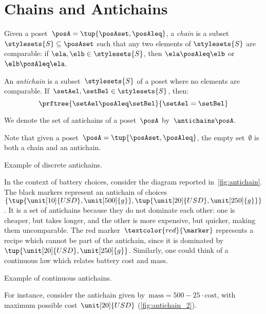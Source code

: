 

\section{Chains and Antichains}
\label{sec:chains-antichains}

\begin{definition}
    \label{def:chain}
    Given a poset~$\posA = \tup{\posAset, \posAleq}$, a \emph{chain} is a subset~$\stylesets{S} \subseteq \posAset$ such that any two elements of $\stylesets{S}$ are comparable: if $\ela, \elb \in \stylesets{S}$, then $\ela \posAleq \elb$ or $\elb \posAleq \ela$.
\end{definition}


\begin{definition}
    \label{def:antichain}
    An \emph{antichain} is a subset~$\stylesets{S}$ of a poset where no elements are comparable.
    If~$\setAel,\setBel \in \stylesets{S}$, then:
    \begin{equation}
        \prftree{\setAel \posAleq \setBel}{\setAel=\setBel}
    \end{equation}
\end{definition}

We denote the set of antichains of a poset~$\posA$ by~$\antichains\posA$.

\begin{remark}
    Note that given a poset~$\posA=\tup{\posAset,\posAleq}$, the empty set~$\emptyset$ is both a chain and an antichain.
\end{remark}


\begin{marginfigure}
    \centering
    \caption{Example of discrete antichains.}
    \label{fig:antichain}
\end{marginfigure}
In the context of battery choices, consider the diagram reported in~\cref{fig:antichain}.
The black markers represent an antichain of choices~$\{\tup{\unit[10]{USD},\unit[500]{g}},\tup{\unit[20]{USD},\unit[250]{g}}\}$.
It is a set of antichains because they do not dominate each other:
one is cheaper, but takes longer, and the other is more expensive, but quicker, making them uncomparable.
The red marker~$\textcolor{red}{\marker}$ represents a recipe which cannot be part of the antichain, since it is dominated by~$\tup{\unit[20]{USD},\unit[250]{g}}$.
Similarly, one could think of a continuous law which relates battery cost and mass.
%
\begin{marginfigure}
    \centering
    \caption{Example of continuous antichains.}
    \label{fig:antichain_2}
\end{marginfigure}
%
For instance, consider the antichain given by~$\text{mass}=500-25\cdot \text{cost}$, with maximum possible cost~$\unit[20]{USD}$ (\cref{fig:antichain_2}).


